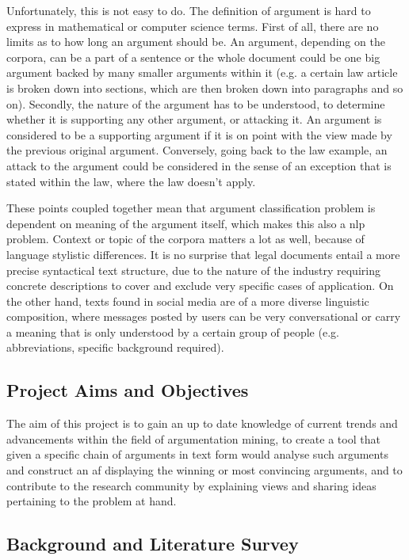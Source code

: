  Unfortunately, this is not easy to do. The definition of argument is hard to express in mathematical or computer science terms. First of all, there are no limits as to how long an argument should be. An argument, depending on the corpora, can be a part of a sentence or the whole document could be one big argument backed by many smaller arguments within it (e.g. a certain law article is broken down into sections, which are then broken down into paragraphs and so on). Secondly, the nature of the argument has to be understood, to determine whether it is supporting any other argument, or attacking it. An argument is considered to be a supporting argument if it is on point with the view made by the previous original argument. Conversely, going back to the law example, an attack to the argument could be considered in the sense of an exception that is stated within the law, where the law doesn't apply. 
 
 These points coupled together mean that argument classification problem is dependent on meaning of the argument itself, which makes this also a \gls{nlp} problem. Context or topic of the corpora matters a lot as well, because of language stylistic differences. It is no surprise that legal documents entail a more precise syntactical text structure, due to the nature of the industry requiring concrete descriptions to cover and exclude very specific cases of application. On the other hand, texts found in social media are of a more diverse linguistic composition, where messages posted by users can be very conversational or carry a meaning that is only understood by a certain group of people (e.g. abbreviations, specific background required).

\subsection{Project Aims and Objectives} 
 The aim of this project is to gain an up to date knowledge of current trends and advancements within the field of argumentation mining, to create a tool that given a specific chain of arguments in text form would analyse such arguments and construct an \gls{af} displaying the winning or most convincing arguments, and to contribute to the research community by explaining views and sharing ideas pertaining to the problem at hand.

\subsection{Background and Literature Survey} \label{sub:background}

